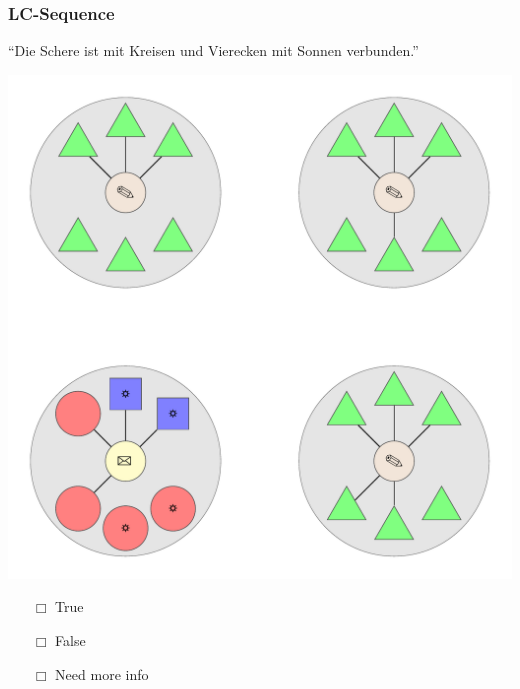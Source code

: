 \documentclass[fleqn,10pt,serif,xcolor=dvipsnames]{beamer}
\newcommand{\LC}{LC\xspace}
\newcommand{\mymark}[1]{{\color{blue}{#1}}}
\begin{document}
\begin{frame}
  \frametitle{\LC-Sequence}
  \begin{center}
    ``Die Schere ist mit Kreisen und Vierecken mit Sonnen verbunden.''

    \vspace{0.1cm}

    \includegraphics[width=0.5 \textwidth]{../../pictures/lc_01_7.pdf}

    \vspace{0.1cm}

    \begin{multicols}{3}
      \begin{itemize} 
      \item[$\Box$] True\\
        \onslide<2>{$\leadsto$  \mymark{false}}
      \item[$\Box$] False\\
        \onslide<2>{$\leadsto$ \mymark{false}}
      \item[$\Box$] Need more info 
      \end{itemize}
    \end{multicols}

  \end{center}
\end{frame}
\end{document}
